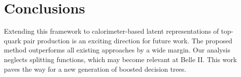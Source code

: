 \section{Conclusions}\label{sec:conclusions}

Extending this framework to calorimeter-based latent representations of
top-quark pair production is an exciting direction for future work. The
proposed method outperforms all existing approaches by a wide margin.
Our analysis neglects splitting functions, which may become relevant at
Belle II. This work paves the way for a new generation of boosted
decision trees.

